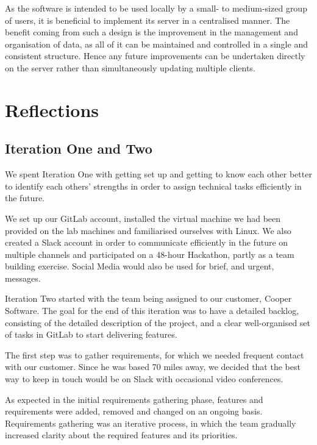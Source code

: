 \documentclass{l3proj}
\begin{document}
As the software is intended to be used locally by a small- to medium-sized group of users, it is beneficial to implement its server in a centralised manner. The benefit coming from such a design is the improvement in the management and organisation of data, as all of it can be maintained and controlled in a single and consistent structure. Hence any future improvements can be undertaken directly on the server rather than simultaneously updating multiple clients. \cite{YadavSingh}


\section{Reflections}
\subsection{Iteration One and Two}

We spent Iteration One with getting set up and getting to know each other better to identify each others’ strengths  in order to assign technical tasks efficiently in the future.

We set up our GitLab account, installed the virtual machine we had been provided on the lab machines and familiarised ourselves with Linux. We also created a Slack account in order to communicate efficiently in the future on multiple channels and participated on a 48-hour Hackathon, partly as a team building exercise. Social Media would also be used for brief, and urgent, messages.

Iteration Two started with the team being assigned to our customer, Cooper Software. The goal for the end of this iteration was to have a detailed backlog, consisting of the detailed description of the project, and a clear well-organised set of tasks in GitLab to start delivering features.

The first step was to gather requirements, for which we needed frequent contact with our customer. Since he was based 70 miles away, we decided that the best way to keep in touch would be on Slack with occasional video conferences.

As expected in the initial requirements gathering phase, features and requirements were added, removed and changed on an ongoing basis. Requirements gathering was an iterative process, in which the team gradually increased clarity about the required features and its priorities.
\end{document}
